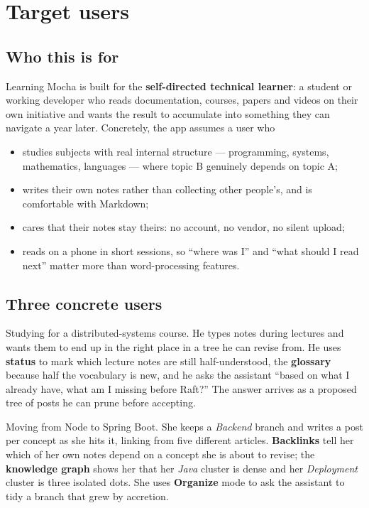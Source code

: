 \section{Target users}
\label{sec:users}

\subsection{Who this is for}

Learning Mocha is built for the \textbf{self-directed technical learner}: a student or working developer
who reads documentation, courses, papers and videos on their own initiative and wants the result to
accumulate into something they can navigate a year later. Concretely, the app assumes a user who

\begin{itemize}
  \item studies subjects with real internal structure --- programming, systems, mathematics, languages
        --- where topic B genuinely depends on topic A;
  \item writes their own notes rather than collecting other people's, and is comfortable with Markdown;
  \item cares that their notes stay theirs: no account, no vendor, no silent upload;
  \item reads on a phone in short sessions, so ``where was I'' and ``what should I read next'' matter more
        than word-processing features.
\end{itemize}

\subsection{Three concrete users}

\begin{mochabox}[title={Minh --- second-year CS student}]
Studying for a distributed-systems course. He types notes during lectures and wants them to end up in the
right place in a tree he can revise from. He uses \textbf{status} to mark which lecture notes are still
half-understood, the \textbf{glossary} because half the vocabulary is new, and he asks the assistant
``based on what I already have, what am I missing before Raft?'' The answer arrives as a proposed tree of
posts he can prune before accepting.
\end{mochabox}

\begin{mochabox}[title={Lan --- backend developer changing stack}]
Moving from Node to Spring Boot. She keeps a \emph{Backend} branch and writes a post per concept as she
hits it, linking  from five different articles. \textbf{Backlinks} tell her
which of her own notes depend on a concept she is about to revise; the \textbf{knowledge graph} shows her
that her \emph{Java} cluster is dense and her \emph{Deployment} cluster is three isolated dots. She uses
\textbf{Organize} mode to ask the assistant to tidy a branch that grew by accretion.
\end{mochabox}

